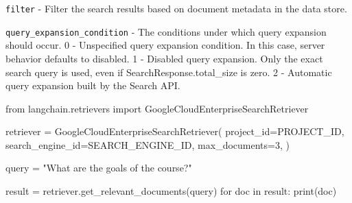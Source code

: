 \documentclass[
  letterpaper,
  DIV=11,
  numbers=noendperiod]{scrreprt}
\newenvironment{Shaded}{\begin{snugshade}}{\end{snugshade}}
\newcommand{\BuiltInTok}[1]{\textcolor[rgb]{0.00,0.23,0.31}{#1}}
\newcommand{\ControlFlowTok}[1]{\textcolor[rgb]{0.00,0.23,0.31}{#1}}
\newcommand{\DecValTok}[1]{\textcolor[rgb]{0.68,0.00,0.00}{#1}}
\newcommand{\ImportTok}[1]{\textcolor[rgb]{0.00,0.46,0.62}{#1}}
\newcommand{\KeywordTok}[1]{\textcolor[rgb]{0.00,0.23,0.31}{#1}}
\newcommand{\NormalTok}[1]{\textcolor[rgb]{0.00,0.23,0.31}{#1}}
\newcommand{\OperatorTok}[1]{\textcolor[rgb]{0.37,0.37,0.37}{#1}}
\newcommand{\StringTok}[1]{\textcolor[rgb]{0.13,0.47,0.30}{#1}}
\begin{document}
\texttt{filter} - Filter the search results based on document metadata
in the data store.

\texttt{query\_expansion\_condition} - The conditions under which query
expansion should occur. 0 - Unspecified query expansion condition. In
this case, server behavior defaults to disabled. 1 - Disabled query
expansion. Only the exact search query is used, even if
SearchResponse.total\_size is zero. 2 - Automatic query expansion built
by the Search API.

\begin{Shaded}
\begin{Highlighting}[]
\ImportTok{from}\NormalTok{ langchain.retrievers }\ImportTok{import}\NormalTok{ GoogleCloudEnterpriseSearchRetriever}
\end{Highlighting}
\end{Shaded}

\begin{Shaded}
\begin{Highlighting}[]
\NormalTok{retriever }\OperatorTok{=}\NormalTok{ GoogleCloudEnterpriseSearchRetriever(}
\NormalTok{    project\_id}\OperatorTok{=}\NormalTok{PROJECT\_ID,}
\NormalTok{    search\_engine\_id}\OperatorTok{=}\NormalTok{SEARCH\_ENGINE\_ID,}
\NormalTok{    max\_documents}\OperatorTok{=}\DecValTok{3}\NormalTok{,}
\NormalTok{)}

\NormalTok{query }\OperatorTok{=} \StringTok{"What are the goals of the course?"}

\NormalTok{result }\OperatorTok{=}\NormalTok{ retriever.get\_relevant\_documents(query)}
\ControlFlowTok{for}\NormalTok{ doc }\KeywordTok{in}\NormalTok{ result:}
    \BuiltInTok{print}\NormalTok{(doc)}
\end{Highlighting}
\end{Shaded}
\end{document}
